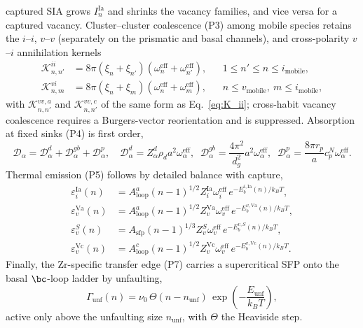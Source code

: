 captured SIA grows $I_n^{\mathrm{Ia}}$ and shrinks the vacancy families,
and vice versa for a captured vacancy. Cluster--cluster coalescence
(P3) among mobile species retains the $i$--$i$, $v$--$v$ (separately on
the prismatic and basal channels), and cross-polarity $v$--$i$
annihilation kernels
\begin{align}
    \mathcal{K}_{n,n'}^{ii}&=8\pi(\xi_n+\xi_{n'})(\omega_n^{\mathrm{eff}}+\omega_{n'}^{\mathrm{eff}}),
        &&1\le n'\le n\le i_{\mathrm{mobile}}, \label{eq:K_ii}\\[2pt]
    \mathcal{K}_{n,m}^{vi}&=8\pi(\xi_n+\xi_m)(\omega_n^{\mathrm{eff}}+\omega_m^{\mathrm{eff}}),
        &&n\le v_{\mathrm{mobile}},\ m\le i_{\mathrm{mobile}}, \label{eq:K_vi}
\end{align}
with $\mathcal{K}_{n,n'}^{vv,a}$ and $\mathcal{K}_{n,n'}^{vv,c}$ of the
same form as Eq.~\eqref{eq:K_ii}; cross-habit vacancy coalescence
requires a Burgers-vector reorientation and is suppressed. Absorption at
fixed sinks (P4) is first order,
\begin{equation}\label{eq:D_total}
    \mathcal{D}_\alpha=\mathcal{D}_\alpha^{d}+\mathcal{D}_\alpha^{gb}+\mathcal{D}_\alpha^{p},
    \quad
    \mathcal{D}_\alpha^{d}=Z_\alpha^{d}\rho_d a^2\omega_\alpha^{\mathrm{eff}},
    \;\;
    \mathcal{D}_\alpha^{gb}=\frac{4\pi^2}{d_g^2}a^2\omega_\alpha^{\mathrm{eff}},
    \;\;
    \mathcal{D}_\alpha^{p}=\frac{8\pi r_p}{a}c_p^{N}\omega_\alpha^{\mathrm{eff}}.
\end{equation}
Thermal emission (P5) follows by detailed balance with capture,
\begin{align}
    \varepsilon_i^{\mathrm{Ia}}(n)&=A_{\mathrm{loop}}^{a}(n{-}1)^{1/2}Z_i^{\mathrm{Ia}}\omega_i^{\mathrm{eff}}\,e^{-E_b^{i,\mathrm{Ia}}(n)/k_BT},
        \label{eq:emit_Ia}\\[2pt]
    \varepsilon_v^{\mathrm{Va}}(n)&=A_{\mathrm{loop}}^{a}(n{-}1)^{1/2}Z_v^{\mathrm{Va}}\omega_v^{\mathrm{eff}}\,e^{-E_b^{v,\mathrm{Va}}(n)/k_BT},
        \label{eq:emit_Va}\\[2pt]
    \varepsilon_v^{S}(n)&=A_{\mathrm{sfp}}(n{-}1)^{1/3}Z_v^{S}\omega_v^{\mathrm{eff}}\,e^{-E_b^{v,S}(n)/k_BT},
        \label{eq:emit_S}\\[2pt]
    \varepsilon_v^{\mathrm{Vc}}(n)&=A_{\mathrm{loop}}^{c}(n{-}1)^{1/2}Z_v^{\mathrm{Vc}}\omega_v^{\mathrm{eff}}\,e^{-E_b^{v,\mathrm{Vc}}(n)/k_BT}.
        \label{eq:emit_Vc}
\end{align}
Finally, the Zr-specific transfer edge (P7) carries a supercritical SFP
onto the basal $\bc$-loop ladder by unfaulting,
\begin{equation}\label{eq:gamma_unf}
    \Gamma_{\mathrm{unf}}(n)=\nu_0\,\Theta(n-n_{\mathrm{unf}})\,
        \exp\!\left(-\frac{E_{\mathrm{unf}}}{k_BT}\right),
\end{equation}
active only above the unfaulting size $n_{\mathrm{unf}}$, with $\Theta$
the Heaviside step.

